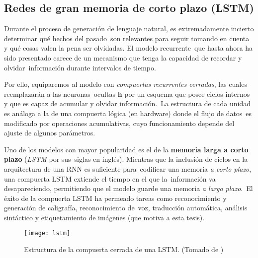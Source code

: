 \subsection{Redes de gran memoria de corto plazo (LSTM)}

Durante el proceso de generación de lenguaje natural, es extremadamente incierto determinar qué hechos del pasado\
son relevantes para seguir tomando en cuenta y qué cosas valen la pena ser olvidadas. El modelo recurrente\
que hasta ahora ha sido presentado carece de un mecanismo que tenga la capacidad de recordar y olvidar\
información durante intervalos de tiempo.\par
Por ello, equiparemos al modelo con \emph{compuertas recurrentes cerradas}, las cuales reemplazarán a las neuronas\
ocultas $\mathbf{h}$ por un esquema que posee ciclos internos y que es capaz de acumular y olvidar información.\
La estructura de cada unidad es análoga a la de una compuerta lógica (en hardware) donde el flujo de datos\
es modificado por operaciones acumulativas, cuyo funcionamiento depende del ajuste de algunos parámetros.\par
Uno de los modelos con mayor popularidad es el de la \textbf{memoria larga a corto plazo} (\emph{LSTM} por sus\
siglas en inglés). Mientras que la inclusión de ciclos en la arquitectura de una RNN es suficiente para\
codificar una memoria \emph{a corto plazo}, una compuerta LSTM extiende el tiempo en el que la\
información va desapareciendo, permitiendo que el modelo guarde una memoria \emph{a largo plazo}.\
El éxito de la compuerta LSTM ha permeado tareas como reconocimiento y generación de caligrafía, reconocimiento de\
voz, traducción automática, análisis sintáctico y etiquetamiento de imágenes (que motiva a esta tesis).

\begin{figure}
  \centering
  \texttt{[image: lstm]}
  \caption{Estructura de la compuerta cerrada de una LSTM.
    (Tomado de \cite{goodfellow-et-al-2016})}
  \label{convnet_fig}
\end{figure}

